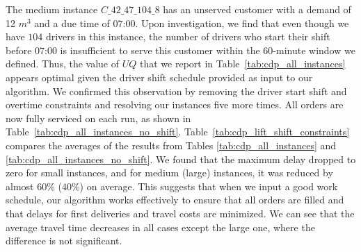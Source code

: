 \documentclass[]{article}
\begin{document}
The medium instance $C\_42\_47\_104\_8$ has an unserved customer with a demand of 12 $m^3$ and a due time of $07\text{:}00$. Upon investigation, we find that even though we have $104$ drivers in this instance, the number of drivers who start their shift before $07\text{:}00$ is insufficient to serve this customer within the 60-minute window we defined. Thus, the value of $UQ$ that we report in Table~\ref{tab:cdp_all_instances} appears optimal given the driver shift schedule provided as input to our algorithm. We confirmed this observation by removing the driver start shift and overtime constraints and resolving our instances five more times. All orders are now fully serviced on each run, as shown in Table~\ref{tab:cdp_all_instances_no_shift}. Table~\ref{tab:cdp_lift_shift_constraints} compares the averages of the results from Tables \ref{tab:cdp_all_instances} and \ref{tab:cdp_all_instances_no_shift}. We found that the maximum delay dropped to zero for small instances, and for medium (large) instances, it was reduced by almost 60\% (40\%) on average. This suggests that when we input a good work schedule, our algorithm works effectively to ensure that all orders are filled and that delays for first deliveries and travel costs are minimized. We can see that the average travel time decreases in all cases except the large one, where the difference is not significant.
\end{document}
